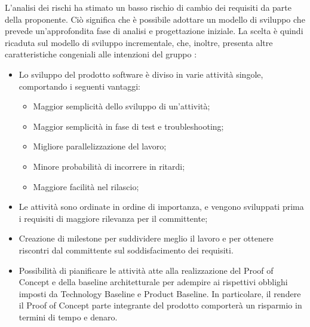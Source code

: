 L'analisi dei rischi ha stimato un basso rischio di cambio dei requisiti da parte della proponente.
Ciò significa che è possibile adottare un modello di sviluppo che prevede un'approfondita fase di 
analisi e progettazione iniziale.
La scelta è quindi ricaduta sul modello di sviluppo incrementale, che, inoltre, presenta altre
caratteristiche congeniali alle intenzioni del gruppo \gruppo \space :
\begin{itemize}
    \item Lo sviluppo del prodotto software è diviso in varie attività singole, comportando i seguenti vantaggi:
    \begin{itemize}
    	\item Maggior semplicità dello sviluppo di un'attività;
    	\item Maggior semplicità in fase di test e {troubleshooting};
    	\item Migliore parallelizzazione del lavoro;
    	\item Minore probabilità di incorrere in ritardi;
    	\item Maggiore facilità nel rilascio;
    \end{itemize}
    \item Le attività sono ordinate in ordine di importanza, e vengono sviluppati prima i requisiti di maggiore rilevanza per il committente;
    \item Creazione di milestone per suddividere meglio il lavoro e per ottenere riscontri dal committente sul soddisfacimento dei requisiti.
    \item Possibilità di pianificare le attività atte alla realizzazione del {Proof of Concept} e della baseline architetturale per adempire ai rispettivi obblighi imposti da Technology Baseline e Product Baseline. In particolare, il rendere il Proof of Concept parte integrante del prodotto comporterà un risparmio in termini di tempo e denaro.
\end{itemize}

